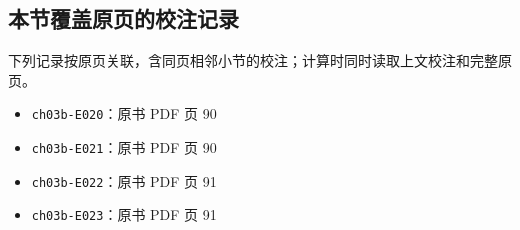 \documentclass[
  10pt,
  fontset=fandol]{ctexart}
\providecommand{\tightlist}{%
  \setlength{\itemsep}{0pt}\setlength{\parskip}{0pt}}
\begin{document}
\subsection{本节覆盖原页的校注记录}\label{ux672cux8282ux8986ux76d6ux539fux9875ux7684ux6821ux6ce8ux8bb0ux5f55}

下列记录按原页关联，含同页相邻小节的校注；计算时同时读取上文校注和完整原页。

\begin{itemize}
\tightlist
\item
  \texttt{ch03b-E020}：原书 PDF 页 90
\item
  \texttt{ch03b-E021}：原书 PDF 页 90
\item
  \texttt{ch03b-E022}：原书 PDF 页 91
\item
  \texttt{ch03b-E023}：原书 PDF 页 91
\end{itemize}
\end{document}

